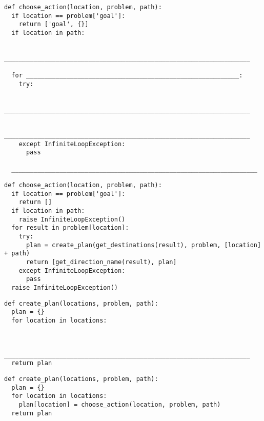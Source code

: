 \begin{lstlisting}
def choose_action(location, problem, path):
  if location == problem['goal']:
    return ['goal', {}]
  if location in path:
  
    ___________________________________________________________________
    
  for __________________________________________________________:
    try:
    
      ___________________________________________________________________
      
      ___________________________________________________________________
    except InfiniteLoopException:
      pass    
      
  ___________________________________________________________________
\end{lstlisting}
\begin{solution}
\begin{lstlisting}
def choose_action(location, problem, path):
  if location == problem['goal']:
    return []
  if location in path:
    raise InfiniteLoopException()
  for result in problem[location]:
    try:
      plan = create_plan(get_destinations(result), problem, [location] + path)
      return [get_direction_name(result), plan]
    except InfiniteLoopException:
      pass
  raise InfiniteLoopException()
\end{lstlisting}

\end{solution}
\begin{lstlisting}
def create_plan(locations, problem, path):
  plan = {}
  for location in locations:
  
  
    ___________________________________________________________________
  return plan
\end{lstlisting}
\begin{solution}
\begin{lstlisting}
def create_plan(locations, problem, path):
  plan = {}
  for location in locations:
    plan[location] = choose_action(location, problem, path)
  return plan
\end{lstlisting}

\end{solution}


